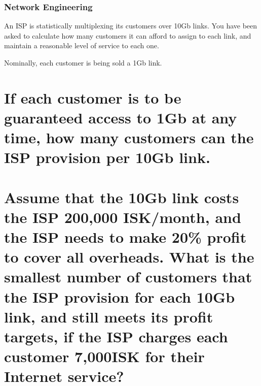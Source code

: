 \documentclass[9pt, addpoints]{exam}
\begin{document}
\begin{questions}


  \section*{Network Engineering}
 \question
   An ISP is statistically multiplexing its customers over 10Gb links.
   You have been asked to calculate how many customers it can afford to assign 
   to each link, and maintain a reasonable level of service to each one.

   Nominally, each customer is being sold a 1Gb link.

  \begin{parts}
  \part[1]{If each customer is to be guaranteed access to 1Gb at any time,
      how many customers can the ISP provision per 10Gb link.}

  \part[2]{Assume that the 10Gb link costs the ISP 200,000 ISK/month,
      and the ISP needs to make 20\% profit to cover all overheads.
      What is the smallest number of customers that the ISP provision 
      for each 10Gb link, and still meets its profit targets, if the 
      ISP charges each customer 7,000ISK for their Internet service?
  }

\end{parts}
\end{questions}
\end{document}

